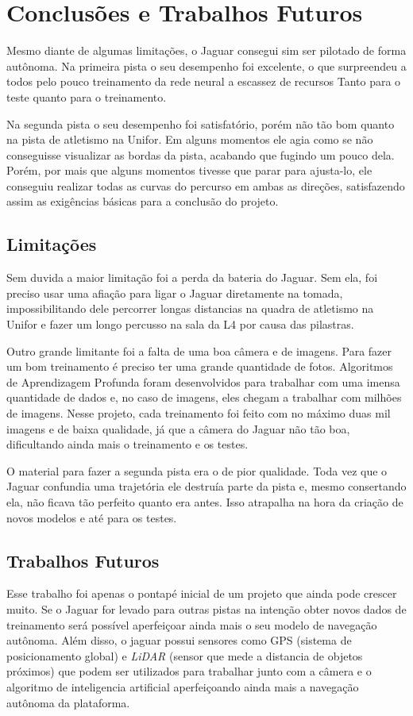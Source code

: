 \chapter{Conclusões e Trabalhos Futuros}
\label{chap:conclusoes-e-trabalhos-futuros}

Mesmo diante de algumas limitações, o Jaguar consegui sim ser pilotado de forma autônoma. Na primeira pista o seu desempenho foi excelente, o que surpreendeu a todos pelo pouco treinamento da rede neural a escassez de recursos Tanto para o teste quanto para o treinamento.

Na segunda pista o seu desempenho foi satisfatório, porém não tão bom quanto na pista de atletismo na Unifor. Em alguns momentos ele agia como se não conseguisse visualizar as bordas da pista, acabando que fugindo um pouco dela. Porém, por mais que alguns momentos tivesse que parar para ajusta-lo, ele conseguiu realizar todas as curvas do percurso em ambas as direções, satisfazendo assim as exigências básicas para a conclusão do projeto.

\section{Limitações}
\label{sec:limitacoes}

Sem duvida a maior limitação foi a perda da bateria do Jaguar. Sem ela, foi preciso usar uma afiação para ligar o Jaguar diretamente na tomada, impossibilitando dele percorrer longas distancias na quadra de atletismo na Unifor e fazer um longo percusso na sala da L4 por causa das pilastras. 

Outro grande limitante foi a falta de uma boa câmera e de imagens. Para fazer um bom treinamento é preciso ter uma grande quantidade de fotos. Algoritmos de Aprendizagem Profunda foram desenvolvidos para trabalhar com uma imensa quantidade de dados e, no caso de imagens, eles chegam a trabalhar com milhões de imagens. Nesse projeto, cada treinamento foi feito com no máximo duas mil imagens e de baixa qualidade, já que a câmera do Jaguar não tão boa, dificultando ainda mais o treinamento e os testes.

O material para fazer a segunda pista era o de pior qualidade. Toda vez que o Jaguar confundia uma trajetória ele destruía parte da pista e, mesmo consertando ela, não ficava tão perfeito quanto era antes. Isso atrapalha na hora da criação de novos modelos e até para os testes.

\section{Trabalhos Futuros}
\label{sec:trabalhos-futuros}

Esse trabalho foi apenas o pontapé inicial de um projeto que ainda pode crescer muito. Se o Jaguar for levado para outras pistas na intenção obter novos dados de treinamento será possível aperfeiçoar ainda mais o seu modelo de navegação autônoma. Além disso, o jaguar possui sensores como GPS  (sistema de posicionamento global) e \textit{LiDAR} (sensor que mede a distancia de objetos próximos) que podem ser utilizados para trabalhar junto com a câmera e o algoritmo de inteligencia artificial aperfeiçoando ainda mais a navegação autônoma da plataforma.